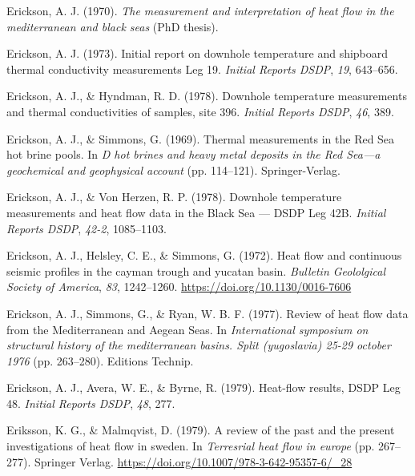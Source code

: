 \begin{CSLReferences}{1}{1}
\leavevmode{}%
Erickson, A. J. (1970). \emph{The measurement and interpretation of heat flow in the mediterranean and black seas} (PhD thesis).

\leavevmode{}%
Erickson, A. J. (1973). Initial report on downhole temperature and shipboard thermal conductivity measurements {Leg} 19. \emph{Initial Reports DSDP}, \emph{19}, 643--656.

\leavevmode{}%
Erickson, A. J., \& Hyndman, R. D. (1978). Downhole temperature measurements and thermal conductivities of samples, site 396. \emph{Initial Reports DSDP}, \emph{46}, 389.

\leavevmode{}%
Erickson, A. J., \& Simmons, G. (1969). Thermal measurements in the {Red Sea} hot brine pools. In \emph{D hot brines and heavy metal deposits in the {Red Sea}---a geochemical and geophysical account} (pp. 114--121). Springer-Verlag.

\leavevmode{}%
Erickson, A. J., \& Von Herzen, R. P. (1978). Downhole temperature measurements and heat flow data in the {Black Sea} --- {DSDP Leg 42B}. \emph{Initial Reports DSDP}, \emph{42-2}, 1085--1103.

\leavevmode{}%
Erickson, A. J., Helsley, C. E., \& Simmons, G. (1972). Heat flow and continuous seismic profiles in the cayman trough and yucatan basin. \emph{Bulletin Geololgical Society of America}, \emph{83}, 1242--1260. \url{https://doi.org/10.1130/0016-7606}

\leavevmode{}%
Erickson, A. J., Simmons, G., \& Ryan, W. B. F. (1977). Review of heat flow data from the {Mediterranean and Aegean Seas}. In \emph{International symposium on structural history of the mediterranean basins. Split (yugoslavia) 25-29 october 1976} (pp. 263--280). Editions Technip.

\leavevmode{}%
Erickson, A. J., Avera, W. E., \& Byrne, R. (1979). Heat-flow results, DSDP {Leg} 48. \emph{Initial Reports DSDP}, \emph{48}, 277.

\leavevmode{}%
Eriksson, K. G., \& Malmqvist, D. (1979). A review of the past and the present investigations of heat flow in sweden. In \emph{Terresrial heat flow in europe} (pp. 267--277). Springer Verlag. \url{https://doi.org/10.1007/978-3-642-95357-6/_28}


\end{CSLReferences}
